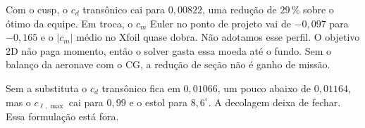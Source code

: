 Com o cusp, o $c_d$ transônico cai para $0{,}00822$, uma redução de
$29\,\%$ sobre o ótimo da equipe. Em troca, o $c_m$ Euler no ponto de
projeto vai de $-0{,}097$ para $-0{,}165$ e o $|c_m|$ médio no Xfoil
quase dobra. Não adotamos esse perfil. O objetivo 2D não paga momento,
então o solver gasta essa moeda até o fundo. Sem o balanço da aeronave
com o CG, a redução de seção não é ganho de missão.

Sem a substituta o $c_d$ transônico fica em $0{,}01066$, um pouco
abaixo de $0{,}01164$, mas o $c_{\ell,\max}$ cai para $0{,}99$ e o
estol para $8{,}6^\circ$. A decolagem deixa de fechar. Essa formulação
está fora.
